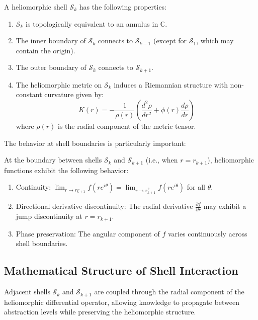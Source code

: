 \begin{proposition}
A heliomorphic shell $\mathcal{S}_k$ has the following properties:
\begin{enumerate}
    \item $\mathcal{S}_k$ is topologically equivalent to an annulus in $\mathbb{C}$.
    \item The inner boundary of $\mathcal{S}_k$ connects to $\mathcal{S}_{k-1}$ (except for $\mathcal{S}_1$, which may contain the origin).
    \item The outer boundary of $\mathcal{S}_k$ connects to $\mathcal{S}_{k+1}$.
    \item The heliomorphic metric on $\mathcal{S}_k$ induces a Riemannian structure with non-constant curvature given by:
    \begin{equation}
    K(r) = -\frac{1}{\rho(r)}\left(\frac{d^2\rho}{dr^2} + \phi(r)\frac{d\rho}{dr}\right)
    \end{equation}
    where $\rho(r)$ is the radial component of the metric tensor.
\end{enumerate}
\end{proposition}

The behavior at shell boundaries is particularly important:

\begin{theorem}
At the boundary between shells $\mathcal{S}_k$ and $\mathcal{S}_{k+1}$ (i.e., when $r = r_{k+1}$), heliomorphic functions exhibit the following behavior:
\begin{enumerate}
    \item Continuity: $\lim_{r \to r_{k+1}^-} f(re^{i\theta}) = \lim_{r \to r_{k+1}^+} f(re^{i\theta})$ for all $\theta$.
    \item Directional derivative discontinuity: The radial derivative $\frac{\partial f}{\partial r}$ may exhibit a jump discontinuity at $r = r_{k+1}$.
    \item Phase preservation: The angular component of $f$ varies continuously across shell boundaries.
\end{enumerate}
\end{theorem}

\subsection{Mathematical Structure of Shell Interaction}

\begin{corollary}
Adjacent shells $\mathcal{S}_k$ and $\mathcal{S}_{k+1}$ are coupled through the radial component of the heliomorphic differential operator, allowing knowledge to propagate between abstraction levels while preserving the heliomorphic structure.
\end{corollary}


